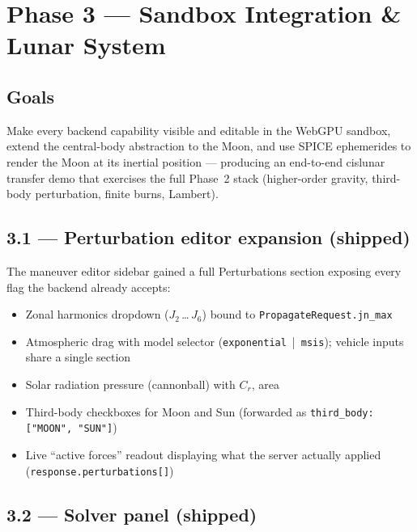 \documentclass[11pt, a4paper]{article}
\begin{document}
\newpage
\section{Phase 3 — Sandbox Integration \& Lunar System}

\subsection{Goals}

Make every backend capability visible and editable in the WebGPU sandbox,
extend the central-body abstraction to the Moon, and use SPICE ephemerides
to render the Moon at its inertial position --- producing an end-to-end
cislunar transfer demo that exercises the full Phase~2 stack
(higher-order gravity, third-body perturbation, finite burns, Lambert).

\subsection{3.1 — Perturbation editor expansion (shipped)}

The maneuver editor sidebar gained a full Perturbations section exposing
every flag the backend already accepts:

\begin{itemize}[leftmargin=*]
  \item Zonal harmonics dropdown ($J_2$\,\dots\,$J_6$) bound to
        \texttt{PropagateRequest.jn\_max}
  \item Atmospheric drag with model selector
        (\texttt{exponential} \,|\, \texttt{msis}); vehicle inputs share
        a single section
  \item Solar radiation pressure (cannonball) with $C_r$, area
  \item Third-body checkboxes for Moon and Sun
        (forwarded as \texttt{third\_body: ["MOON", "SUN"]})
  \item Live ``active forces'' readout displaying what the server actually
        applied (\texttt{response.perturbations[]})
\end{itemize}

\subsection{3.2 — Solver panel (shipped)}
\end{document}
